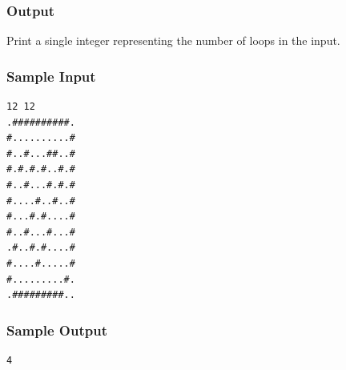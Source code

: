 \documentclass{article}
\begin{document}
\subsubsection*{Output}
Print a single integer representing the number of loops in the input.

\subsubsection*{Sample Input}
\begin{verbatim}
12 12
.##########.
#..........#
#..#...##..#
#.#.#.#..#.#
#..#...#.#.#
#....#..#..#
#...#.#....#
#..#...#...#
.#..#.#....#
#....#.....#
#.........#.
.#########..
\end{verbatim}
\subsubsection*{Sample Output}
\begin{verbatim}
4
\end{verbatim}
\end{document}
